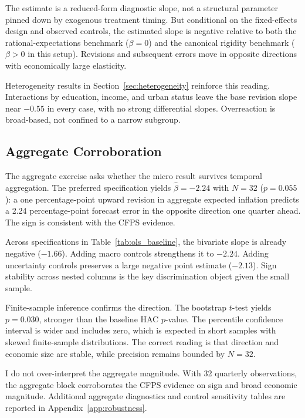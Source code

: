 The estimate is a reduced-form diagnostic slope, not a structural
parameter pinned down by exogenous treatment timing. But conditional on
the fixed-effects design and observed controls, the estimated slope is
negative relative to both the rational-expectations benchmark
($\beta = 0$) and the canonical rigidity benchmark ($\beta > 0$ in this
setup). Revisions and subsequent errors move in opposite directions with
economically large elasticity.

Heterogeneity results in Section~\ref{sec:heterogeneity} reinforce this
reading. Interactions by education, income, and urban status leave the
base revision slope near $-0.55$ in every case, with no strong
differential slopes. Overreaction is broad-based, not confined to a
narrow subgroup.



\subsection{Aggregate Corroboration}
\label{sec:aggregate_corroboration}

The aggregate exercise asks whether the micro result survives temporal
aggregation. The preferred specification yields
$\hat{\beta} = -2.24$ with $N = 32$ ($p = 0.055$): a one
percentage-point upward revision in aggregate expected inflation predicts
a 2.24 percentage-point forecast error in the opposite direction one
quarter ahead. The sign is consistent with the CFPS evidence.

Across specifications in Table~\ref{tab:ols_baseline}, the bivariate
slope is already negative ($-1.66$). Adding macro controls strengthens
it to $-2.24$. Adding uncertainty controls preserves a large negative
point estimate ($-2.13$). Sign stability across nested columns is the
key discrimination object given the small sample.

Finite-sample inference confirms the direction. The bootstrap $t$-test
yields $p = 0.030$, stronger than the baseline HAC $p$-value. The
percentile confidence interval is wider and includes zero, which is
expected in short samples with skewed finite-sample distributions. The
correct reading is that direction and economic size are stable, while
precision remains bounded by $N = 32$.

I do not over-interpret the aggregate magnitude. With 32 quarterly
observations, the aggregate block corroborates the CFPS evidence on sign
and broad economic magnitude. Additional aggregate diagnostics and control sensitivity
tables are reported in Appendix~\ref{app:robustness}.

